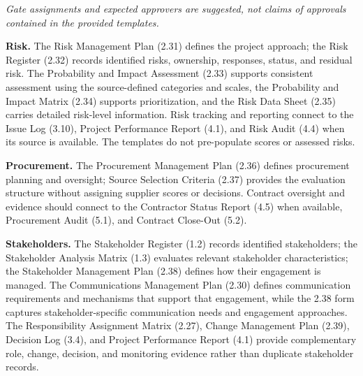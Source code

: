 \documentclass[10pt,letterpaper]{article}
\newcommand{\docsection}[1]{\par\Needspace{5\baselineskip}\vspace{8pt}{\large\sffamily\bfseries\color{navy}#1}\par\vspace{2pt}{\color{rulegrey}\rule{\linewidth}{.6pt}}\par}
\begin{document}
\textit{Gate assignments and expected approvers are suggested, not claims of approvals contained in the provided templates.}
\docsection{Cross-artifact governance relationships}
\textbf{Risk.} The Risk Management Plan (2.31) defines the project approach; the Risk Register (2.32) records identified risks, ownership, responses, status, and residual risk. The Probability and Impact Assessment (2.33) supports consistent assessment using the source-defined categories and scales, the Probability and Impact Matrix (2.34) supports prioritization, and the Risk Data Sheet (2.35) carries detailed risk-level information. Risk tracking and reporting connect to the Issue Log (3.10), Project Performance Report (4.1), and Risk Audit (4.4) when its source is available. The templates do not pre-populate scores or assessed risks.

\textbf{Procurement.} The Procurement Management Plan (2.36) defines procurement planning and oversight; Source Selection Criteria (2.37) provides the evaluation structure without assigning supplier scores or decisions. Contract oversight and evidence should connect to the Contractor Status Report (4.5) when available, Procurement Audit (5.1), and Contract Close-Out (5.2).

\textbf{Stakeholders.} The Stakeholder Register (1.2) records identified stakeholders; the Stakeholder Analysis Matrix (1.3) evaluates relevant stakeholder characteristics; the Stakeholder Management Plan (2.38) defines how their engagement is managed. The Communications Management Plan (2.30) defines communication requirements and mechanisms that support that engagement, while the 2.38 form captures stakeholder-specific communication needs and engagement approaches. The Responsibility Assignment Matrix (2.27), Change Management Plan (2.39), Decision Log (3.4), and Project Performance Report (4.1) provide complementary role, change, decision, and monitoring evidence rather than duplicate stakeholder records.
\end{document}
